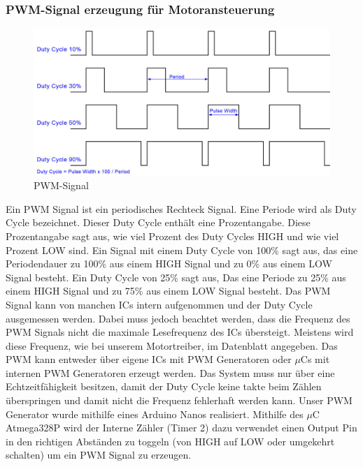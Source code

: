 \subsubsection{PWM-Signal erzeugung für Motoransteuerung}
\begin{figure}[H] 
\begin{center}

\includegraphics[width=12cm]{Bilder/PWM/Duty_Cycle}
\caption{PWM-Signal}
\label{PWM_Signal}

\end{center}
\end{figure}
Ein PWM Signal ist ein periodisches Rechteck Signal. Eine Periode wird als Duty Cycle bezeichnet. Dieser Duty Cycle enthält eine Prozentangabe. Diese Prozentangabe sagt aus, wie viel Prozent des Duty Cycles HIGH und wie viel Prozent LOW sind. Ein Signal mit einem Duty Cycle von 100\% sagt aus, das eine Periodendauer zu 100\% aus einem HIGH Signal und zu 0\% aus einem LOW Signal besteht. Ein Duty Cycle von 25\% sagt aus, Das eine Periode zu 25\% aus einem HIGH Signal und zu 75\% aus einem LOW Signal besteht. Das PWM Signal kann von manchen ICs intern aufgenommen und der Duty Cycle ausgemessen werden. Dabei muss jedoch beachtet werden, dass die Frequenz des PWM Signals nicht die maximale Lesefrequenz des ICs übersteigt. Meistens wird diese Frequenz, wie bei unserem Motortreiber, im Datenblatt angegeben. Das PWM kann entweder über eigene ICs mit PWM Generatoren oder $\mu$Cs mit internen PWM Generatoren erzeugt werden. Das System muss nur über eine Echtzeitfähigkeit besitzen, damit der Duty Cycle keine takte beim Zählen überspringen und damit nicht die Frequenz fehlerhaft werden kann. 
Unser PWM Generator wurde mithilfe eines Arduino Nanos realisiert. Mithilfe des $\mu$C Atmega328P wird der Interne Zähler (Timer 2) dazu verwendet einen Output Pin in den richtigen Abständen zu toggeln (von HIGH auf LOW oder umgekehrt schalten) um ein PWM Signal zu erzeugen.


